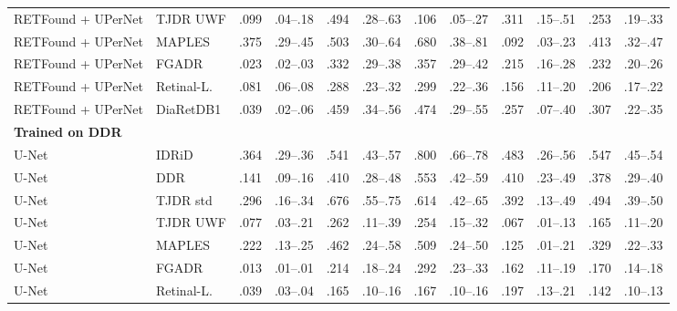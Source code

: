 \begin{landscape}
{\begin{longtable}{l l c c c c c c c c c c}
RETFound + UPerNet & TJDR UWF & .099 & \scriptsize .04--.18 & .494 & \scriptsize .28--.63 & .106 & \scriptsize .05--.27 & .311 & \scriptsize .15--.51 & .253 & \scriptsize .19--.33 \\
RETFound + UPerNet & MAPLES & .375 & \scriptsize .29--.45 & .503 & \scriptsize .30--.64 & .680 & \scriptsize .38--.81 & .092 & \scriptsize .03--.23 & .413 & \scriptsize .32--.47 \\
RETFound + UPerNet & FGADR & .023 & \scriptsize .02--.03 & .332 & \scriptsize .29--.38 & .357 & \scriptsize .29--.42 & .215 & \scriptsize .16--.28 & .232 & \scriptsize .20--.26 \\
RETFound + UPerNet & Retinal-L. & .081 & \scriptsize .06--.08 & .288 & \scriptsize .23--.32 & .299 & \scriptsize .22--.36 & .156 & \scriptsize .11--.20 & .206 & \scriptsize .17--.22 \\
RETFound + UPerNet & DiaRetDB1 & .039 & \scriptsize .02--.06 & .459 & \scriptsize .34--.56 & .474 & \scriptsize .29--.55 & .257 & \scriptsize .07--.40 & .307 & \scriptsize .22--.35 \\
\multicolumn{12}{l}{\textbf{Trained on DDR}}\\
U-Net & IDRiD & .364 & \scriptsize .29--.36 & .541 & \scriptsize .43--.57 & .800 & \scriptsize .66--.78 & .483 & \scriptsize .26--.56 & .547 & \scriptsize .45--.54 \\
U-Net & DDR & .141 & \scriptsize .09--.16 & .410 & \scriptsize .28--.48 & .553 & \scriptsize .42--.59 & .410 & \scriptsize .23--.49 & .378 & \scriptsize .29--.40 \\
U-Net & TJDR std & .296 & \scriptsize .16--.34 & .676 & \scriptsize .55--.75 & .614 & \scriptsize .42--.65 & .392 & \scriptsize .13--.49 & .494 & \scriptsize .39--.50 \\
U-Net & TJDR UWF & .077 & \scriptsize .03--.21 & .262 & \scriptsize .11--.39 & .254 & \scriptsize .15--.32 & .067 & \scriptsize .01--.13 & .165 & \scriptsize .11--.20 \\
U-Net & MAPLES & .222 & \scriptsize .13--.25 & .462 & \scriptsize .24--.58 & .509 & \scriptsize .24--.50 & .125 & \scriptsize .01--.21 & .329 & \scriptsize .22--.33 \\
U-Net & FGADR & .013 & \scriptsize .01--.01 & .214 & \scriptsize .18--.24 & .292 & \scriptsize .23--.33 & .162 & \scriptsize .11--.19 & .170 & \scriptsize .14--.18 \\
U-Net & Retinal-L. & .039 & \scriptsize .03--.04 & .165 & \scriptsize .10--.16 & .167 & \scriptsize .10--.16 & .197 & \scriptsize .13--.21 & .142 & \scriptsize .10--.13 \\

\end{longtable}}
\end{landscape}
